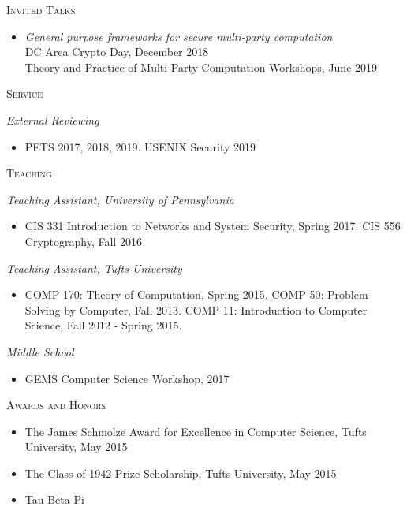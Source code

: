\documentclass{article}
\begin{document}
\textsc{Invited Talks}
\begin{itemize}[label={}]
\item \emph{General purpose frameworks for secure multi-party computation}\\
  DC Area Crypto Day, December 2018 \\
  Theory and Practice of Multi-Party Computation Workshops, June 2019
\end{itemize}

\textsc{Service}

\textit{External Reviewing}
\begin{itemize}[label={},noitemsep]
\item PETS 2017, 2018, 2019. USENIX Security 2019
\end{itemize}

\textsc{Teaching}

\textit{Teaching Assistant, University of Pennsylvania} 
\begin{itemize}[label={}]
\item CIS 331 Introduction to Networks and System Security, Spring 2017.
CIS 556 Cryptography, Fall 2016
\end{itemize}

\textit{Teaching Assistant, Tufts University} 
\begin{itemize}[label={}]
\item COMP 170: Theory of Computation, Spring 2015.
COMP 50: Problem-Solving by Computer, Fall 2013.
COMP 11: Introduction to Computer Science, Fall 2012 - Spring 2015.
\end{itemize}

\textit{Middle School}
\begin{itemize}[label={},noitemsep]
\item GEMS Computer Science Workshop, 2017
\end{itemize}

\textsc{Awards and Honors}
\begin{itemize}[label={},noitemsep]
\item The James Schmolze Award for Excellence in Computer Science, Tufts University, May 2015
\item The Class of 1942 Prize Scholarship, Tufts University, May 2015
\item Tau Beta Pi
\end{itemize}
\end{document}
